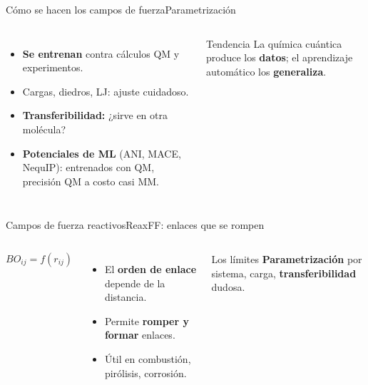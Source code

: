 \documentclass[aspectratio=169]{beamer}
\begin{document}
\begin{frame}{Cómo se hacen los campos de fuerza}{Parametrización}
  \begin{columns}[T,onlytextwidth]
      \begin{itemize}\setlength\itemsep{5pt}
        \item \textbf{Se entrenan} contra cálculos QM y experimentos.
        \item Cargas, diedros, LJ: ajuste cuidadoso.
        \item \textbf{Transferibilidad:} ¿sirve en otra molécula?
        \item \textbf{Potenciales de ML} (ANI, MACE, NequIP): entrenados con QM, precisión QM a costo casi MM.
      \end{itemize}
      \begin{exampleblock}{Tendencia}
        La química cuántica produce los \textbf{datos}; el aprendizaje automático los \textbf{generaliza}.
      \end{exampleblock}
  \end{columns}
\end{frame}

\begin{frame}{Campos de fuerza reactivos}{ReaxFF: enlaces que se rompen}
  \begin{columns}[T,onlytextwidth]
      \[ BO_{ij}=f(r_{ij}) \]
      \begin{itemize}\setlength\itemsep{4pt}
        \item El \textbf{orden de enlace} depende de la distancia.
        \item Permite \textbf{romper y formar} enlaces.
        \item Útil en combustión, pirólisis, corrosión.
      \end{itemize}
      \begin{alertblock}{Los límites}
        \textbf{Parametrización} por sistema, carga, \textbf{transferibilidad} dudosa.
      \end{alertblock}
  \end{columns}
\end{frame}
\end{document}
